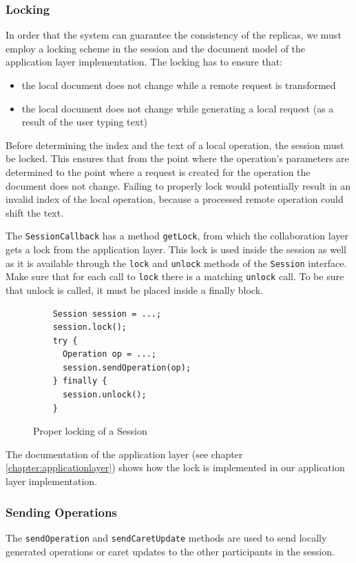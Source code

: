 \subsubsection{Locking}
In order that the system can guarantee the consistency of the replicas, we
must employ a locking scheme in the session and the document model of
the application layer implementation. The locking has to ensure that:

\begin{itemize}
 \item the local document does not change while a remote request is 
transformed
 \item the local document does not change while generating a local request (as a result of the user typing text)
\end{itemize}

Before determining the index and the text of a local operation, the session must
be locked. This ensures that from the point where the operation's parameters
are determined
to the point where a request is created for the operation the document does
not change. Failing to properly lock would potentially result in an invalid index of the local operation, because a processed remote operation could 
shift the text.

The \texttt{Session\-Callback} has a method \texttt{get\-Lock}, from which
the collaboration layer gets a lock from the application layer. This
lock is used inside the session as well as it is available through the
\texttt{lock} and \texttt{unlock} methods of the \texttt{Session} interface.
Make sure that for each call to
\texttt{lock} there is a matching \texttt{unlock} call. To be sure that unlock
is called, it must be placed inside a finally block.

\begin{figure}[H]
 \small{\begin{verbatim}
    Session session = ...;
    session.lock();
    try {
      Operation op = ...;
      session.sendOperation(op);
    } finally {
      session.unlock();
    }
 \end{verbatim}}
 \caption{Proper locking of a Session}
\end{figure}

The documentation of the application layer (see chapter 
\ref{chapter:applicationlayer}) 
shows how the lock is implemented in our application layer implementation.


\subsubsection{Sending Operations}
The \texttt{send\-Operation} and \texttt{send\-Caret\-Update} 
methods are used to send locally generated operations or
caret updates to the other participants in the session. 

